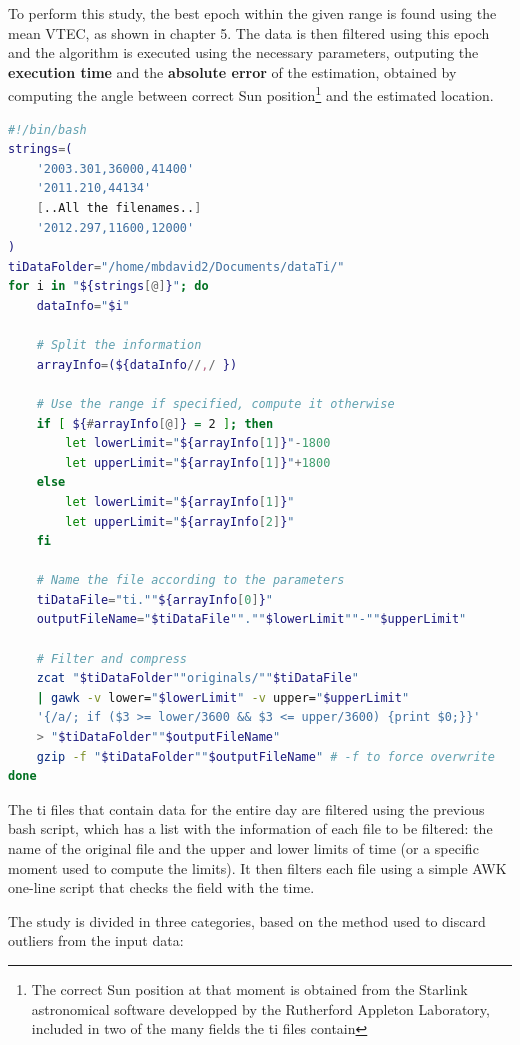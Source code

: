 To perform this study, the best epoch within the given range is found using the mean VTEC, as shown in chapter 5. The data is then filtered using this epoch and the algorithm is executed using the necessary parameters, outputing the \textbf{execution time} and the \textbf{absolute error} of the estimation, obtained by computing the angle between correct Sun position\footnote{The correct Sun position at that moment is obtained from the Starlink astronomical software developped by the Rutherford Appleton Laboratory, included in two of the many fields the ti files contain} and the estimated location.

\begin{minipage}{\linewidth}
	\begin{lstlisting}[language=Bash, caption=Filtering the ti file]
#!/bin/bash	
strings=(
	'2003.301,36000,41400'
	'2011.210,44134'
	[..All the filenames..] 
	'2012.297,11600,12000'
)
tiDataFolder="/home/mbdavid2/Documents/dataTi/"
for i in "${strings[@]}"; do
	dataInfo="$i"
	
	# Split the information
	arrayInfo=(${dataInfo//,/ })
	
	# Use the range if specified, compute it otherwise
	if [ ${#arrayInfo[@]} = 2 ]; then
		let lowerLimit="${arrayInfo[1]}"-1800
		let upperLimit="${arrayInfo[1]}"+1800
	else
		let lowerLimit="${arrayInfo[1]}"
		let upperLimit="${arrayInfo[2]}"
	fi
	
	# Name the file according to the parameters
	tiDataFile="ti.""${arrayInfo[0]}"
	outputFileName="$tiDataFile"".""$lowerLimit""-""$upperLimit"
	
	# Filter and compress
	zcat "$tiDataFolder""originals/""$tiDataFile" 
	| gawk -v lower="$lowerLimit" -v upper="$upperLimit" 
	'{/a/; if ($3 >= lower/3600 && $3 <= upper/3600) {print $0;}}' 
	> "$tiDataFolder""$outputFileName"
	gzip -f "$tiDataFolder""$outputFileName" # -f to force overwrite
done\end{lstlisting}
\end{minipage}

The ti files that contain data for the entire day are filtered using the previous bash script, which has a list with the information of each file to be filtered: the name of the original file and the upper and lower limits of time (or a specific moment used to compute the limits). It then filters each file using a simple AWK one-line script that checks the field with the time.

The study is divided in three categories, based on the method used to discard outliers from the input data:

